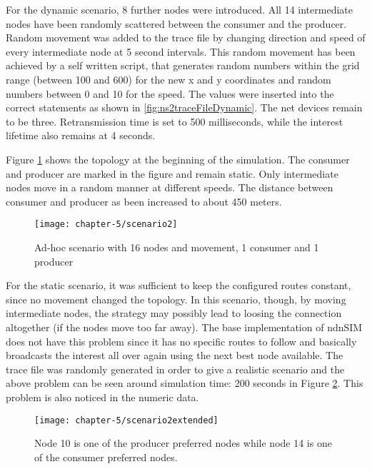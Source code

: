 For the dynamic scenario, 8 further nodes were introduced. All 14 intermediate nodes have been randomly scattered between the consumer and the producer. Random movement was added to the trace file by changing direction and speed of every intermediate node at 5 second intervals. This random movement has been achieved by a self written script, that generates random numbers within the grid range (between 100 and 600) for the new x and y coordinates and random numbers between 0 and 10 for the speed. The values were inserted into the correct statements as shown in \ref{fig:ns2traceFileDynamic}. The net devices remain to be three. Retransmission time is set to 500 milliseconds, while the interest lifetime also remains at 4 seconds. 

Figure \ref{fig:scenario2} shows the topology at the beginning of the simulation. The consumer and producer are marked in the figure and remain static. Only intermediate nodes move in a random manner at different speeds. The distance between consumer and producer as been increased to about 450 meters.

\vspace{5mm} %

\begin{figure}[H]
  \centering
  \texttt{[image: chapter-5/scenario2]}
  \caption{Ad-hoc scenario with 16 nodes and movement, 1 consumer and 1 producer}
  \label{fig:scenario2}
\end{figure}

\vspace{5mm} %

For the static scenario, it was sufficient to keep the configured routes constant, since no movement changed the topology. In this scenario, though, by moving intermediate nodes, the strategy may possibly lead to loosing the connection altogether (if the nodes move too far away). The base implementation of ndnSIM does not have this problem since it has no specific routes to follow and basically broadcasts the interest all over again using the next best node available. The trace file was randomly generated in order to give a realistic scenario and the above problem can be seen around simulation time: 200 seconds in Figure \ref{fig:scenario2extended}. This problem is also noticed in the numeric data.

\vspace{5mm} %

\begin{figure}[H]
  \centering
  \texttt{[image: chapter-5/scenario2extended]}
  \caption{Node 10 is one of the producer preferred nodes while node 14 is one of the consumer preferred nodes.}
  \label{fig:scenario2extended}
\end{figure}

